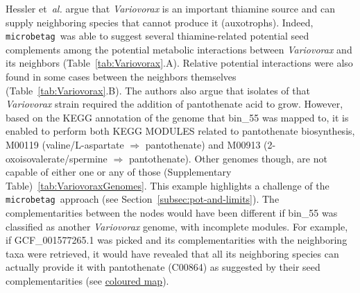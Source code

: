 \documentclass[sn-mathphys,Numbered]{sn-jnl}  %
\theoremstyle{thmstyleone}%
\theoremstyle{thmstyletwo}%
\theoremstyle{thmstylethree}%
\newcommand{\microbetag}{\texttt{microbetag }}
\begin{document}
        Hessler et~\textit{al.} argue that \textit{Variovorax} is an important thiamine source and can supply neighboring species that cannot produce it (auxotrophs). 
        Indeed, \microbetag was able to suggest several thiamine-related potential seed complements among the potential metabolic interactions between \textit{Variovorax} and its neighbors (Table~\ref{tab:Variovorax}.A). 
        Relative potential interactions were also found in some cases between the neighbors themselves (Table~\ref{tab:Variovorax}.B).
        The authors also argue that isolates of that \textit{Variovorax} strain required the addition of pantothenate acid to grow. 
        However, based on the KEGG annotation of the genome that bin\_55 was mapped to, it is enabled to perform both KEGG MODULES related to pantothenate biosynthesis,  
        M00119 (valine/L-aspartate $\Rightarrow$ pantothenate) and 
        M00913 (2-oxoisovalerate/spermine $\Rightarrow$ pantothenate).
        Other genomes though, are not capable of either one or any of those (Supplementary Table)~\ref{tab:VariovoraxGenomes}.
        This example highlights a challenge of the \microbetag approach (see Section~\ref{subsec:pot-and-limits}). 
        The complementarities between the nodes would have been different if bin\_55 was classified as another \textit{Variovorax} genome, with incomplete modules. 
        For example, if GCF\_001577265.1 was picked and its complementarities with the neighboring taxa were retrieved, it would have revealed that all its neighboring species can actually provide it with pantothenate (C00864) as suggested by their seed complementarities (see
        \href{https://www.kegg.jp/kegg-bin/show_pathway?map00770/C00049%20skyblue%2Cblue/C00099%20skyblue%2Cblue/C00141%20skyblue%2Cblue/C00966%20skyblue%2Cblue/C00010%20skyblue%2Cblue/C00882%20skyblue%2Cblue/C01134%20skyblue%2Cblue/C03492%20skyblue%2Cblue/C04352%20skyblue%2Cblue/C00099%20skyblue%2Cblue/C00141%20skyblue%2Cblue/C00966%20skyblue%2Cblue/C05665%20skyblue%2Cblue/C00010%20skyblue%2Cblue/C00141%20skyblue%2Cblue/C00882%20skyblue%2Cblue/C00966%20skyblue%2Cblue/C01134%20skyblue%2Cblue/C03492%20skyblue%2Cblue/C04352%20skyblue%2Cblue/C18911%20skyblue%2Cblue/C00864%09%23ff0000/C00864%09%23ff0000/C00864%09%23ff0000/}{coloured map}). 




\end{document}
